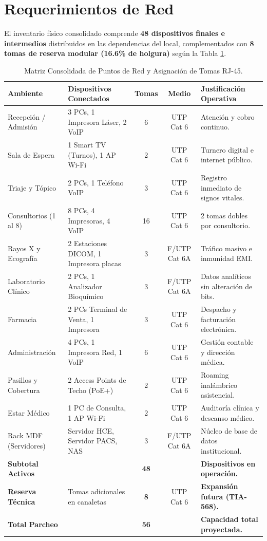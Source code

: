 \documentclass[11pt,a4paper]{article}
\begin{document}
\section{Requerimientos de Red}

El inventario físico consolidado comprende \textbf{48 dispositivos finales e intermedios} distribuidos en las dependencias del local, complementados con \textbf{8 tomas de reserva modular (16.6\% de holgura)} según la Tabla \ref{tab:requerimientos}.

\begin{table}[h!]
\centering
\small
\caption{Matriz Consolidada de Puntos de Red y Asignación de Tomas RJ-45.}
\label{tab:requerimientos}
\begin{tabularx}{\textwidth}{l p{4.8cm} c c X}
\toprule
\textbf{Ambiente} & \textbf{Dispositivos Conectados} & \textbf{Tomas} & \textbf{Medio} & \textbf{Justificación Operativa} \\
\midrule
Recepción / Admisión & 3 PCs, 1 Impresora Láser, 2 VoIP & 6 & UTP Cat 6 & Atención y cobro continuo. \\
Sala de Espera & 1 Smart TV (Turnos), 1 AP Wi-Fi & 2 & UTP Cat 6 & Turnero digital e internet público. \\
Triaje y Tópico & 2 PCs, 1 Teléfono VoIP & 3 & UTP Cat 6 & Registro inmediato de signos vitales. \\
Consultorios (1 al 8) & 8 PCs, 4 Impresoras, 4 VoIP & 16 & UTP Cat 6 & 2 tomas dobles por consultorio. \\
Rayos X y Ecografía & 2 Estaciones DICOM, 1 Impresora placas & 3 & F/UTP Cat 6A & Tráfico masivo e inmunidad EMI. \\
Laboratorio Clínico & 2 PCs, 1 Analizador Bioquímico & 3 & F/UTP Cat 6A & Datos analíticos sin alteración de bits. \\
Farmacia & 2 PCs Terminal de Venta, 1 Impresora & 3 & UTP Cat 6 & Despacho y facturación electrónica. \\
Administración & 4 PCs, 1 Impresora Red, 1 VoIP & 6 & UTP Cat 6 & Gestión contable y dirección médica. \\
Pasillos y Cobertura & 2 Access Points de Techo (PoE+) & 2 & UTP Cat 6 & Roaming inalámbrico asistencial. \\
Estar Médico & 1 PC de Consulta, 1 AP Wi-Fi & 2 & UTP Cat 6 & Auditoría clínica y descanso médico. \\
Rack MDF (Servidores) & Servidor HCE, Servidor PACS, NAS & 3 & F/UTP Cat 6A & Núcleo de base de datos institucional. \\
\midrule
\textbf{Subtotal Activos} & & \textbf{48} & & \textbf{Dispositivos en operación.} \\
\textbf{Reserva Técnica} & Tomas adicionales en canaletas & \textbf{8} & UTP Cat 6 & \textbf{Expansión futura (TIA-568).} \\
\midrule
\textbf{Total Parcheo} & & \textbf{56} & & \textbf{Capacidad total proyectada.} \\
\bottomrule
\end{tabularx}
\end{table}
\end{document}

